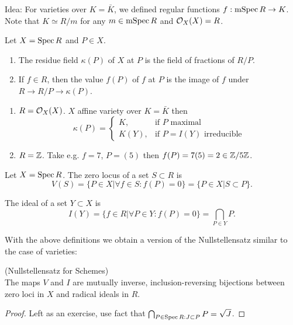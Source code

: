 \documentclass[a4paper,11pt]{article}
\begin{document}
			Idea: For varieties over $K=\bar{K}$, we defined regular functions $f:\operatorname{mSpec} R\rightarrow K$. Note that $K\simeq R/m$ for any $m
			\in\operatorname{mSpec} R$ and $\mathcal{O}_X(X)=R$.

			\begin{defi}
				Let $X=\operatorname{Spec} R$ and $P\in X$.
				\begin{enumerate}
					\item The residue field $\kappa(P)$ of $X$ at $P$ is the field of fractions of $R/P$.
					\item If $f\in R$, then the value $f(P)$ of $f$ at $P$ is the image of $f$ under $R\rightarrow R/P\rightarrow\kappa(P)$.
				\end{enumerate}
			\end{defi}

			\begin{eg}
				\begin{enumerate}
					\item $R=\mathcal{O}_X(X)$. $X$ affine variety over $K=\bar{K}$ then 
						\begin{equation*}
							\kappa(P)=\begin{cases}
							K,& \text{if $P$ maximal}\\
							K(Y),&\text{if $P=I(Y)$ irreducible}
							\end{cases}
						\end{equation*}
					\item $R=\mathbb{Z}$. Take e.g. $f=7$, $P=(5)$ then $f(P)=7(5)=2\in\mathbb{Z}/5\mathbb{Z}$.
				\end{enumerate}
			\end{eg}

			\begin{defi}
				Let $X=\operatorname{Spec} R$. The zero locus of a set $S\subset R$ is
				\begin{equation}
					V(S)=\{P\in X|\forall f\in S:f(P)=0\}=\{P\in X|S\subset P\}.
				\end{equation}
			\end{defi}

			\begin{defi}
				The ideal of a set $Y\subset X$ is
				\begin{equation}
					I(Y)=\{f\in R|\forall P\in Y:f(P)=0\}=\bigcap_{P\in Y}P.
				\end{equation}
			\end{defi}

			With the above definitions we obtain a version of the Nullstellensatz similar to the case of varieties:

			\begin{thm}
				(Nullstellensatz for Schemes)\\ The maps $V$ and $I$ are mutually inverse, inclusion-reversing bijections between zero loci in $X$ and radical ideals in $R$. 
			\end{thm}
			\begin{proof}\renewcommand{\qedsymbol}{}
				Left as an exercise, use fact that $\bigcap_{P\in\operatorname{Spec} R: J\subset P}P=\sqrt{J}$.
			\end{proof}\renewcommand{\qedsymbol}{$\square$}
\end{document}
